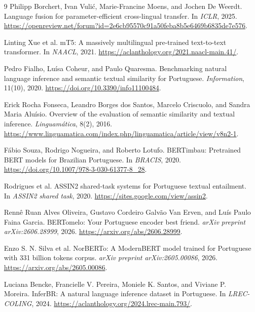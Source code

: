 \documentclass[10pt]{article}
\begin{document}
\begin{thebibliography}{9}
Philipp Borchert, Ivan Vuli\'c, Marie-Francine Moens, and Jochen De Weerdt.
\newblock Language fusion for parameter-efficient cross-lingual transfer.
\newblock In \emph{ICLR}, 2025.
\url{https://openreview.net/forum?id=2e6cb95570c91a50feba8b5e6469b6835de7e576}.

Linting Xue et al.
\newblock mT5: A massively multilingual pre-trained text-to-text transformer.
\newblock In \emph{NAACL}, 2021.
\url{https://aclanthology.org/2021.naacl-main.41/}.

Pedro Fialho, Lu\'isa Coheur, and Paulo Quaresma.
\newblock Benchmarking natural language inference and semantic textual similarity for Portuguese.
\newblock \emph{Information}, 11(10), 2020.
\url{https://doi.org/10.3390/info11100484}.

Erick Rocha Fonseca, Leandro Borges dos Santos, Marcelo Criscuolo, and
Sandra Maria Alu\'isio.
\newblock Overview of the evaluation of semantic similarity and textual inference.
\newblock \emph{Linguam\'atica}, 8(2), 2016.
\url{https://www.linguamatica.com/index.php/linguamatica/article/view/v8n2-1}.

F\'abio Souza, Rodrigo Nogueira, and Roberto Lotufo.
\newblock BERTimbau: Pretrained BERT models for Brazilian Portuguese.
\newblock In \emph{BRACIS}, 2020.
\url{https://doi.org/10.1007/978-3-030-61377-8_28}.

Rodrigues et al.
\newblock ASSIN2 shared-task systems for Portuguese textual entailment.
\newblock In \emph{ASSIN2 shared task}, 2020.
\url{https://sites.google.com/view/assin2}.

Renn\^e Ruan Alves Oliveira, Gustavo Cordeiro Galv\~ao Van Erven, and Lu\'is
Paulo Faina Garcia.
\newblock BERTomelo: Your Portuguese encoder best friend.
\newblock \emph{arXiv preprint arXiv:2606.28999}, 2026.
\url{https://arxiv.org/abs/2606.28999}.

Enzo S. N. Silva et al.
\newblock NorBERTo: A ModernBERT model trained for Portuguese with 331 billion tokens corpus.
\newblock \emph{arXiv preprint arXiv:2605.00086}, 2026.
\url{https://arxiv.org/abs/2605.00086}.

Luciana Bencke, Francielle V. Pereira, Moniele K. Santos, and Viviane P. Moreira.
\newblock InferBR: A natural language inference dataset in Portuguese.
\newblock In \emph{LREC-COLING}, 2024.
\url{https://aclanthology.org/2024.lrec-main.793/}.

\end{thebibliography}
\end{document}
